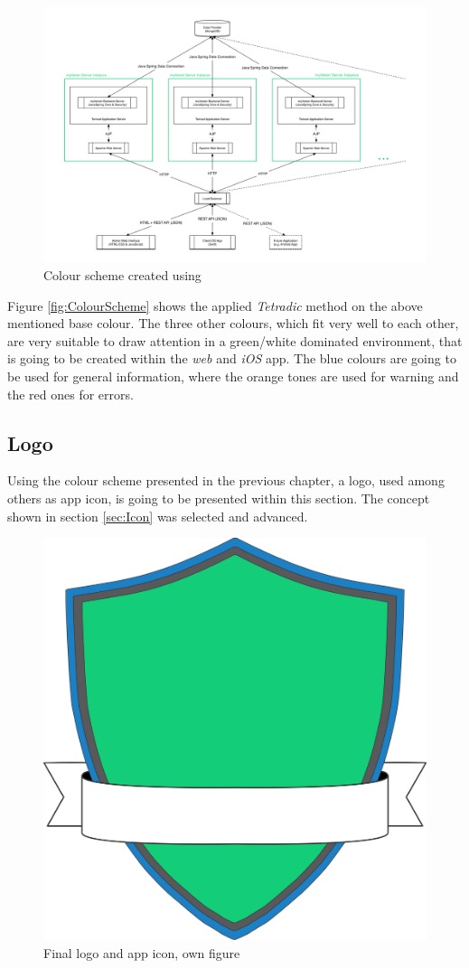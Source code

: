 \begin{figure}[h]
  	\centering
  	\includegraphics[width=0.95\linewidth]{./images/architecture.png}
  	\caption{Colour scheme created using \cite{Paletton:2015aa}}
	\label{fig:ColourScheme}
\end{figure}

Figure \vref{fig:ColourScheme} shows the applied \emph{Tetradic} method on the above mentioned base colour. The three other colours, which fit very well to each other, are very suitable to draw attention in a green/white dominated environment, that is going to be created within the \emph{web} and \emph{iOS} app. The blue colours are going to be used for general information, where the orange tones are used for warning and the red ones for errors.

\subsection{Logo}
\label{sec:Logo}
Using the colour scheme presented in the previous chapter, a logo, used among others as app icon, is going to be presented within this section. The concept shown in section \vref{sec:Icon} was selected and advanced. 

\begin{figure}[h]
  	\centering
  	\includegraphics[width=0.45\linewidth]{./images/logo-final.png}
  	\caption{Final logo and app icon, own figure}
	\label{fig:Logo}
\end{figure}

